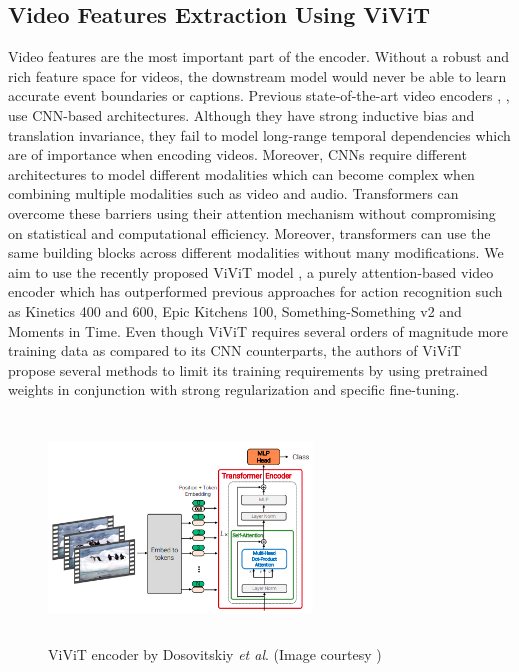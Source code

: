 \subsection{Video Features Extraction Using ViViT} \label{video-feat-extraction}
\par Video features are the most important part of the encoder. Without a robust and rich feature space for videos, the downstream model would never be able to learn accurate event boundaries or captions. Previous state-of-the-art video encoders \cite{carreira2018quo}, \cite{csn}, \cite{r(2+1)d} use CNN-based architectures. Although they have strong inductive bias and translation invariance, they fail to model long-range temporal dependencies which are of importance when encoding videos. Moreover, CNNs require different architectures to model different modalities which can become complex when combining multiple modalities such as video and audio. Transformers \cite{tfm} can overcome these barriers using their attention mechanism without compromising on statistical and computational efficiency. Moreover, transformers can use the same building blocks across different modalities without many modifications. We aim to use the recently proposed ViViT model \cite{vivit}, a purely attention-based video encoder which has outperformed previous approaches for action recognition such as  Kinetics 400 and 600, Epic
Kitchens 100, Something-Something v2 and Moments in Time. Even though ViViT requires several orders of magnitude more training data as compared to its CNN counterparts, the authors of ViViT propose several methods to limit its training requirements by using pretrained weights in conjunction with strong regularization and specific fine-tuning.

\begin{figure} [H]
	\centering
	\includegraphics[width=7cm, height=6cm] {assets/img/vivit_methodology.png}
	\caption{ViViT encoder by Dosovitskiy \textit{et al}. (Image courtesy \cite{vivit})}
\end{figure}

